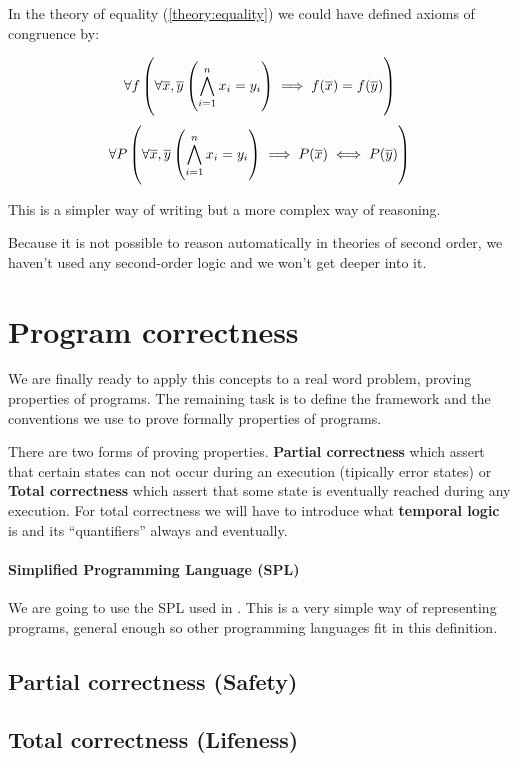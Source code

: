In the theory of equality (\ref{theory:equality}) we could have defined axioms of congruence by:

\[\forall f \left( \forall \overline{x},\overline{y} \left( \bigwedge_{i=1}^n x_i = y_i \right) \implies f(\overline{x}) = f(\overline{y}) \right)\]
\[\forall P \left( \forall \overline{x},\overline{y} \left( \bigwedge_{i=1}^n x_i = y_i \right) \implies P(\overline{x}) \iff P(\overline{y}) \right)\]

This is a simpler way of writing but a more complex way of reasoning.

Because it is not possible to reason automatically in theories of second order, we haven't used any second-order logic and we won't get deeper into it.




\section{Program correctness}

We are finally ready to apply this concepts to a real word problem, proving properties of programs.
The remaining task is to define the framework and the conventions we use to prove formally properties of programs.

There are two forms of proving properties. \textbf{Partial correctness} which assert that certain states can not occur during an execution (tipically error states) or \textbf{Total correctness} which assert that some state is eventually reached during any execution. For total correctness we will have to introduce what \textbf{temporal logic} is and its ``quantifiers'' always and eventually.


\paragraph{Simplified Programming Language (SPL)}

\label{def:SPL}

We are going to use the \gls{SPL} used in \citep[II.1]{thesisAle}. This is a very simple way of representing programs, general enough so other programming languages fit in this definition. 


\subsection{Partial correctness (Safety)}



\subsection{Total correctness (Lifeness)}

